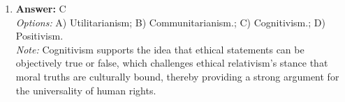\documentclass[12pt]{article}
\begin{document}
\begin{enumerate}[label=\arabic*.]
\\ \textit{Options:} A) Article 2(4) encompasses only armed force; B) Article 2(4) encompasses all types of force, including sanctions; C) Article 2(4) encompasses all interference in the domestic affairs of States; D) Article 2(4) encompasses force directed only against a State's territorial integrity
\\ \textit{Note:} Article 2(4) of the UN Charter specifically prohibits the use of armed force by member states in their international relations, thereby limiting its scope to military action rather than other forms of force or coercion.
\item \textbf{Answer:} C
\\ \textit{Options:} A) Utilitarianism; B) Communitarianism.; C) Cognitivism.; D) Positivism.
\\ \textit{Note:} Cognitivism supports the idea that ethical statements can be objectively true or false, which challenges ethical relativism's stance that moral truths are culturally bound, thereby providing a strong argument for the universality of human rights.
\end{enumerate}
\end{document}
